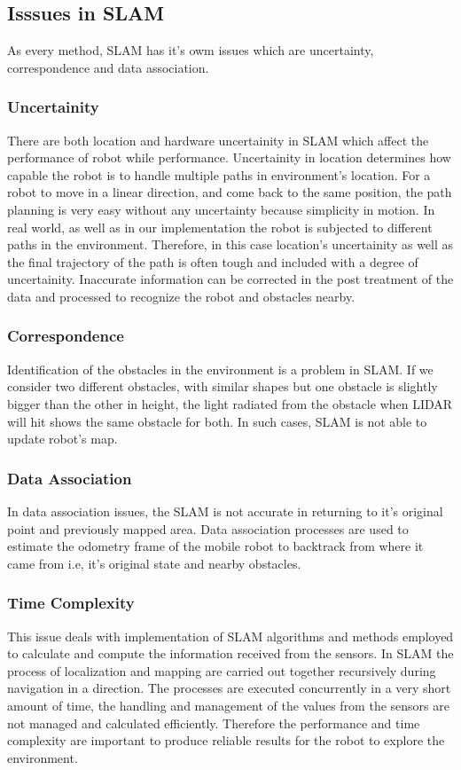 \subsection{Isssues in SLAM}
As every method, SLAM has it's owm issues which are uncertainty, correspondence and data association.
\subsubsection{Uncertainity}
There are both location and hardware uncertainity in SLAM which affect the performance of robot while performance. Uncertainity in location determines how capable the robot is to handle multiple paths in environment's location. For a robot
to move in a linear direction, and come back to the same position, the path planning is very easy without any uncertainty because simplicity in motion. In real world, as well as in our implementation the robot is subjected to different paths in the environment.
Therefore, in this case location's uncertainity as well as the final trajectory of the path is often tough and included with a degree of uncertainity. Inaccurate information can be corrected in the post treatment of the data and processed to recognize the robot and obstacles nearby.
\subsubsection{Correspondence}
Identification of the obstacles in the environment is a problem in SLAM. If we consider two different obstacles, with similar shapes but one obstacle is slightly bigger than the other in height, the light radiated from the obstacle when LIDAR will hit shows the same obstacle for both. In such cases, SLAM is not able to update robot's map.
\subsubsection{Data Association}
In data association issues, the SLAM is not accurate in returning to it's original point and previously mapped area. Data association processes are used to estimate the odometry frame of the mobile robot to backtrack from where it came from i.e, it's original state and nearby obstacles.
\subsubsection{Time Complexity}
This issue deals with implementation of SLAM algorithms and methods employed to calculate and compute the information received from the sensors. In 
SLAM the process of localization and mapping are carried out together recursively during navigation in a direction. The processes are executed concurrently in a very short amount of time, the handling and management of the values from the sensors are not managed and calculated efficiently. 
Therefore the performance and time complexity are important to produce reliable results for the robot to explore the environment.

